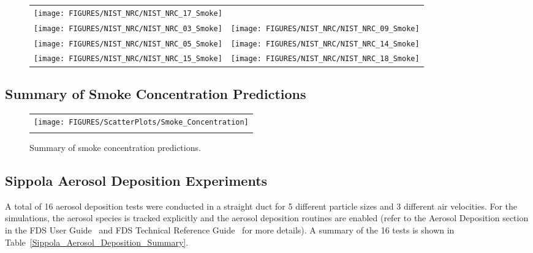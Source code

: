 \begin{figure}[p]
\begin{tabular*}{\textwidth}{l@{\extracolsep{\fill}}r}
\texttt{[image: FIGURES/NIST\_NRC/NIST\_NRC\_17\_Smoke]} &
 \\
\texttt{[image: FIGURES/NIST\_NRC/NIST\_NRC\_03\_Smoke]} &
\texttt{[image: FIGURES/NIST\_NRC/NIST\_NRC\_09\_Smoke]} \\
\texttt{[image: FIGURES/NIST\_NRC/NIST\_NRC\_05\_Smoke]} &
\texttt{[image: FIGURES/NIST\_NRC/NIST\_NRC\_14\_Smoke]} \\
\texttt{[image: FIGURES/NIST\_NRC/NIST\_NRC\_15\_Smoke]} &
\texttt{[image: FIGURES/NIST\_NRC/NIST\_NRC\_18\_Smoke]}
\end{tabular*}
\end{figure}

\clearpage

\subsection{Summary of Smoke Concentration Predictions}

\begin{figure}[h!]
\begin{center}
\begin{tabular}{c}
\texttt{[image: FIGURES/ScatterPlots/Smoke\_Concentration]} \\
\vspace{0.25in} \\
\end{tabular}
\end{center}
\caption[Summary of smoke concentration predictions]
{Summary of smoke concentration predictions.}
\end{figure}


\clearpage

\subsection{Sippola Aerosol Deposition Experiments}

A total of 16 aerosol deposition tests were conducted in a straight duct for 5 different
particle sizes and 3 different air velocities. For the simulations, the aerosol species is tracked
explicitly and the aerosol deposition routines are enabled (refer to the Aerosol Deposition section
in the FDS User Guide~\cite{FDS_Users_Guide} and FDS Technical Reference Guide~\cite{FDS_Math_Guide}
for more details). A summary of the 16 tests is shown in Table~\ref{Sippola_Aerosol_Deposition_Summary}.

